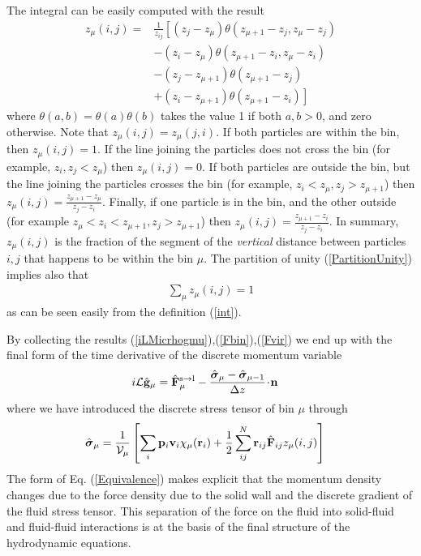 \documentclass[b5paper,openright,11pt]{book}
\newcommand{\esc}{\!\cdot\!}
\begin{document}
The integral can be easily computed with the result
\begin{align}
 z_\mu(i,j)=&\frac{1}{z_{ij}}\left[(z_j-z_\mu) \theta(z_{\mu+1}-z_{j},z_\mu-z_{j} )\right.
\nonumber\\
&-(z_i-z_\mu) \theta(z_{\mu+1}-z_i,z_\mu-z_i)
\nonumber\\
&-(z_{j}-z_{\mu+1}) \theta(z_{\mu+1}-z_{j})
\nonumber\\
&\left.+(z_i-z_{\mu+1}) \theta (z_{\mu+1}-z_i)\right]
\end{align}
where  $\theta(a,b)=\theta(a)\theta(b)$  takes  the value  1  if  both
$a,b>0$, and  zero otherwise.  Note that  $z_\mu(i,j)=z_\mu(j,i)$.  If
both particles are within the bin,  then $ z_\mu(i,j)=1$.  If the line
joining  the   particles  does  not   cross  the  bin   (for  example,
$z_i,z_j<z_\mu$) then  $z_\mu(i,j)=0$.  If both particles  are outside
the  bin, but  the line  joining the  particles crosses  the bin  (for
example,                $z_i<z_\mu,z_j>z_{\mu+1}$)                then
$z_\mu(i,j)=\frac{z_{\mu+1}-z_\mu}{z_j-z_i}$. Finally, if one particle
is   in    the   bin,   and    the   other   outside    (for   example
$z_\mu<z_i<z_{\mu+1},               z_j>z_{\mu+1}$)               then
$z_\mu(i,j)=\frac{z_{\mu+1}-z_i}{z_j-z_i}$.  In  summary, $z_\mu(i,j)$
is  the fraction  of  the segment  of  the \textit{vertical}  distance
between particles $i,j$ that happens to  be within the bin $\mu$. 
The  partition  of unity  (\ref{PartitionUnity})
implies also that
\begin{align}
  \sum_\mu z_{\mu}(i,j) =1
\label{zmu1}
\end{align}
as can be seen easily from the definition (\ref{int}).

By                collecting                the                results
(\ref{iLMicrhogmu}),(\ref{Fbin}),(\ref{Fvir}) we end  up
with the final form of the time derivative of the discrete momentum variable
\begin{align}
  i{\cal L}\hat{\bf g}_\mu &=\hat{\bf F}_\mu^{\rm s\to l}-\frac{\hat{\boldsymbol{\sigma}}_\mu-\hat{\boldsymbol{\sigma}}_{\mu-1}}{\Delta z}\esc{\bf n}
\label{Equivalence}
\end{align}
where we have introduced the discrete stress tensor of bin $\mu$ through
\begin{align}
 \hat{ \boldsymbol{\sigma}}_{\mu}
&=
\frac{1}{{\cal V}_\mu} \left[\sum_i{\bf p}_i{\bf v}_i\chi_\mu({\bf r}_i)
+\frac{1}{2}\sum^{N}_{ij}{\bf r}_{ij}\hat{\bf F}_{ij}z_\mu(i,j)\right]
\label{sbin}
\end{align}
The form of  Eq. (\ref{Equivalence}) makes explicit  that the momentum
density changes due to the force density due to the solid wall and the
discrete gradient of  the fluid stress tensor. This  separation of the
force on the fluid into  solid-fluid and fluid-fluid interactions is at
the basis of the final structure of the hydrodynamic equations.
\end{document}
